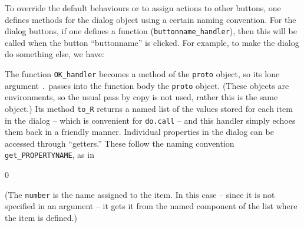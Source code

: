 \documentclass{article}
\newcommand{\code}[1]{\texttt{#1}} %
\newcommand{\generic}[1]{\code{#1}} %
\newcommand{\meth}[1]{\generic{#1}}     %
\newcommand{\object}[1]{\code{#1}}
\newcommand{\pkg}[1]{\texttt{#1}}
\begin{document}
To override the default behaviours or to assign actions to other
buttons, one defines methods for the dialog object using a certain
naming convention. For the dialog buttons, if one defines a function
(\meth{buttonname\_handler}), then this will be called when the button
``buttonname'' is clicked. For example, to make the dialog do
something else, we have:
\begin{Schunk}
\end{Schunk}

The function \meth{OK\_handler} becomes a method of the \pkg{proto}
object, so its lone argument \object{.} passes into the function body the
\pkg{proto} object. (These objects are environments, so the usual pass
by copy is not used, rather this is the same object.) Its method \meth{to\_R} returns a named list of
the values stored for each item in the dialog -- which is convenient
for \code{do.call} --  and this handler simply
echoes them back in a friendly manner. Individual properties in the
dialog can be accessed through ``getters.'' These follow the naming
convention \code{get\_PROPERTYNAME}, as in
\begin{Schunk}
\begin{Soutput}
[1] 0
\end{Soutput}
\end{Schunk}
(The \code{number} is the name assigned to the item. In this case --
since it is not specified in an argument -- it
gets it from the named component of the list where the item is defined.)
\end{document}

